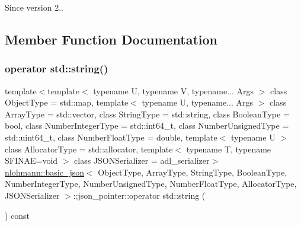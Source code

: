 \begin{DoxySince}{Since}
version 2.. 
\end{DoxySince}


\subsection{Member Function Documentation}
\mbox{\label{classnlohmann_1_1basic__json_1_1json__pointer_aa2583b66886218c1a035e3e507a5f931}} 
\subsubsection{\texorpdfstring{operator std::string()}{operator std::string()}}
{\footnotesize\ttfamily template$<$template$<$ typename U, typename V, typename... Args $>$ class Object\+Type = std\+::map, template$<$ typename U, typename... Args $>$ class Array\+Type = std\+::vector, class String\+Type  = std\+::string, class Boolean\+Type  = bool, class Number\+Integer\+Type  = std\+::int64\+\_\+t, class Number\+Unsigned\+Type  = std\+::uint64\+\_\+t, class Number\+Float\+Type  = double, template$<$ typename U $>$ class Allocator\+Type = std\+::allocator, template$<$ typename T, typename S\+F\+I\+N\+A\+E=void $>$ class J\+S\+O\+N\+Serializer = adl\+\_\+serializer$>$ \\
\mbox{\hyperlink{classnlohmann_1_1basic__json}{nlohmann\+::basic\+\_\+json}}$<$ Object\+Type, Array\+Type, String\+Type, Boolean\+Type, Number\+Integer\+Type, Number\+Unsigned\+Type, Number\+Float\+Type, Allocator\+Type, J\+S\+O\+N\+Serializer $>$\+::json\+\_\+pointer\+::operator std\+::string (\begin{DoxyParamCaption}{ }\end{DoxyParamCaption}) const\hspace{0.3cm}{\ttfamily [inline]}}



